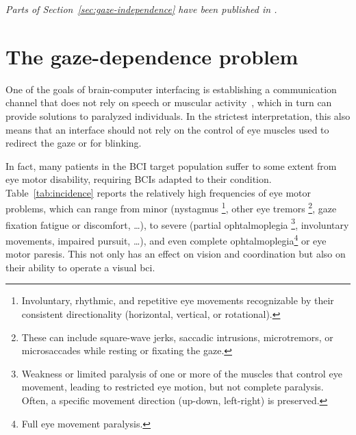 \emph{Parts of Section~\ref{sec:gaze-independence} have been published in \textcite{VanDenKerchove2024}.}


\section{The gaze-dependence problem}
\label{sec:gaze-dependence}


One of the goals of brain-computer interfacing is establishing a communication
channel that does not rely on speech or muscular activity~\cite{Naci2012,Chaudhary2016},
which in turn can provide solutions to paralyzed individuals.
In the strictest interpretation, this also means that an interface should not
rely on the control of eye muscles used to redirect the gaze or for blinking.

In fact, many patients in the BCI target population suffer to some extent
from eye motor disability, requiring BCIs adapted to their condition.
Table~\ref{tab:incidence} reports the relatively high frequencies of
eye motor problems, which can range from minor (nystagmus
\footnote{
Involuntary, rhythmic, and repetitive eye movements recognizable by their
consistent directionality (horizontal, vertical, or rotational).
}, other eye tremors
\footnote{
These can include square-wave jerks, saccadic intrusions, microtremors, or
microsaccades while resting or fixating the gaze.
}, gaze fixation fatigue or discomfort, \ldots), to severe (partial ophtalmoplegia
\footnote{
Weakness or limited paralysis of one or more of the muscles that control eye
movement, leading to restricted eye motion, but not complete paralysis.
Often, a specific movement direction (up-down, left-right) is preserved.
}, involuntary movements, impaired pursuit, \ldots), and even complete
ophtalmoplegia\footnote{Full eye movement paralysis.} or eye motor paresis.
This not only has an effect on vision and coordination but also
on their ability to operate a visual \ac{bci}.

